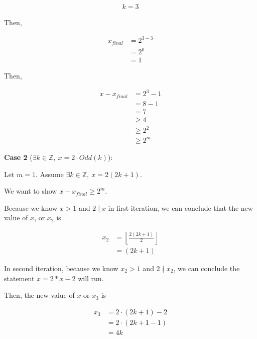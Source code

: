 \documentclass[12pt]{article}
\begin{document}
\begin{enumerate}[a.]
    \begin{align}
        k = 3
    \end{align}

    \bigskip

    Then,

    \begin{align}
        x_{final} &= 2^{3-3}\\
        &= 2^0\\
        &= 1
    \end{align}

    \bigskip

    Then,

    \bigskip

    \begin{align}
        x - x_{final} &= 2^3 - 1\\
        &= 8 - 1\\
        &= 7\\
        &\geq 4\\
        &\geq 2^2\\
        &\geq 2^m
    \end{align}

    \bigskip

    \textbf{Case 2} ($\exists k \in \mathbb{Z},\:x = 2 \cdot Odd(k)$):

    \bigskip

    Let $m = 1$. Assume $\exists k \in \mathbb{Z},\:x = 2(2k+1)$.

    \bigskip

    We want to show $x - x_{final} \geq 2^m$.

    \bigskip

    Because we know $x > 1$ and $2 \mid x$ in first iteration, we can conclude
    that the new value of $x$, or $x_2$ is

    \begin{align}
        x_2 &= \left\lfloor \frac{2(2k+1)}{2} \right\rfloor\\
        &= (2k + 1)
    \end{align}

    \bigskip

    In second iteration, because we know $x_2 > 1$ and $2 \nmid x_2$,
    we can conclude the statement $x = 2 * x - 2$ will run.

    \bigskip

    Then, the new value of $x$ or $x_3$ is

    \begin{align}
        x_3 &= 2 \cdot (2k + 1) - 2\\
        &= 2 \cdot (2k+1-1)\\
        &= 4k
    \end{align}


\end{enumerate}
\end{document}
